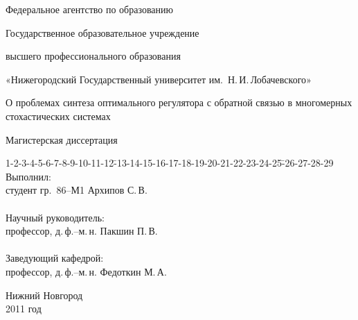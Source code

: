 
\begin{titlepage}
	\begin{center}
		\par Федеральное агентство по образованию\vspace{0.7mm}
		\par Государственное образовательное учреждение\vspace{0.7mm}
		\par высшего профессионального образования\vspace{1.5mm}
		\par «Нижегородский Государственный университет им.~Н.\,И.\,Лобачевского»
		\vspace{1cm}
		{\fontsize{18pt}{9mm}  \selectfont
            \par О проблемах синтеза оптимального регулятора с обратной связью в многомерных стохастических системах
        }
        \vspace{2cm}
        \par {\large Магистерская диссертация}
    \end{center}
    \vspace{2cm}
    \begin{tabbing}
        1-2-3-4-5-6-7-8-9-10-11-12\=-13-14-15-16-17-18-19-20-21-22-23-24-25\=-26-27-28-29 \kill
        {\fontsize{10pt}{10pt} \selectfont Выполнил:}                 \>                      \>                 \\
        {\fontsize{10pt}{10pt} \selectfont студент гр.~86--М1}        \>                      \> {\fontsize{10pt}{10pt} \selectfont Архипов С.\,В.}  \\
        \\
        {\fontsize{10pt}{10pt} \selectfont Научный руководитель:}     \>                      \>                 \\
        {\fontsize{10pt}{10pt} \selectfont профессор, д.\,ф.--м.\,н.} \>                      \> {\fontsize{10pt}{10pt} \selectfont Пакшин П.\,В.}   \\
        \\
        {\fontsize{10pt}{10pt} \selectfont Заведующий кафедрой:}     \>                      \>                 \\
        {\fontsize{10pt}{10pt} \selectfont профессор, д.\,ф.--м.\,н.} \>                      \> {\fontsize{10pt}{10pt} \selectfont Федоткин М.\,А.}
    \end{tabbing}
    \vspace{3cm}
    \begin{center} {\fontsize{10pt}{3mm}  \selectfont
        Нижний Новгород \\
        2011 год
    } \end{center}
\end{titlepage}

